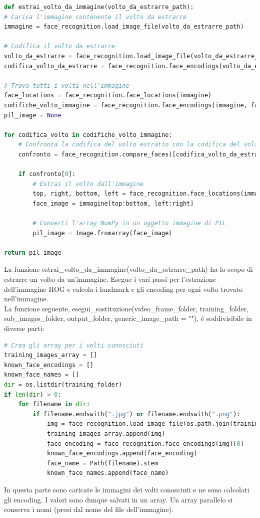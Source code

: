 \documentclass{report}
\begin{document}
\begin{lstlisting}[language=Python, breaklines=true]
def estrai_volto_da_immagine(volto_da_estrarre_path):
# Carica l'immagine contenente il volto da estrarre
immagine = face_recognition.load_image_file(volto_da_estrarre_path)

# Codifica il volto da estrarre
volto_da_estrarre = face_recognition.load_image_file(volto_da_estrarre_path)
codifica_volto_da_estrarre = face_recognition.face_encodings(volto_da_estrarre)[0]

# Trova tutti i volti nell'immagine
face_locations = face_recognition.face_locations(immagine)
codifiche_volto_immagine = face_recognition.face_encodings(immagine, face_locations)
pil_image = None

for codifica_volto in codifiche_volto_immagine:
    # Confronta la codifica del volto estratto con la codifica del volto dall'immagine
    confronto = face_recognition.compare_faces([codifica_volto_da_estrarre], codifica_volto)

    if confronto[0]:
        # Estrai il volto dall'immagine
        top, right, bottom, left = face_recognition.face_locations(immagine)[0]
        face_image = immagine[top:bottom, left:right]

        # Converti l'array NumPy in un oggetto immagine di PIL
        pil_image = Image.fromarray(face_image)

return pil_image
\end{lstlisting}
La funzione estrai\_volto\_da\_immagine(volto\_da\_estrarre\_path) ha lo scopo di estrarre un volto da un'immagine. Esegue i vari passi per l'estrazione dell'immagine HOG e calcola i landmark e gli encoding per ogni volto trovato nell'immagine. \\

La funzione seguente, esegui\_sostituzione(video\_frame\_folder, training\_folder, sub\_images\_folder, output\_folder, generic\_image\_path = ""), é soddivisibile in diverse parti:

\begin{lstlisting}[language=Python, breaklines=true]
# Crea gli array per i volti conosciuti
training_images_array = []
known_face_encodings = []
known_face_names = []
dir = os.listdir(training_folder)
if len(dir) > 0:
    for filename in dir:
        if filename.endswith(".jpg") or filename.endswith(".png"):
            img = face_recognition.load_image_file(os.path.join(training_folder, filename))
            training_images_array.append(img)
            face_encoding = face_recognition.face_encodings(img)[0]
            known_face_encodings.append(face_encoding)
            face_name = Path(filename).stem
            known_face_names.append(face_name)
\end{lstlisting}
In questa parte sono caricate le immagini dei volti conosciuti e ne sono calcolati gli encoding. I valori sono dunque salvati in un array. Un array parallelo si conserva i nomi (presi dal nome del file dell'immagine).
\end{document}

